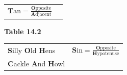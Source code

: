 {{\begin{center}
\begin{tabular}[t]{|l|l|}
                  \begin{math}\mathbf{T}\mathrm{an}=\frac{\mathbf{O}\mathrm{pposite}}{\mathbf{A}\mathrm{djacent}}\end{math}
     \tabularnewline\cline{1-1}\cline{2-2}
    \end{tabular}
      \end{center}
    \begin{center}{\small\bfseries Table 14.2}\end{center}
          }{ %
        \begin{center}
      \label{m39408*id79953}
    \noindent
      \tablelasttail{}
      \begin{xtabular}[t]{|l|l|}\hline
        \textbf{S}illy \textbf{O}ld \textbf{H}ens &
                  \begin{math}\mathbf{S}\mathrm{in}=\frac{\mathbf{O}\mathrm{pposite}}{\mathbf{H}\mathrm{ypotenuse}}\end{math}
     \tabularnewline{}
        \textbf{C}ackle \textbf{A}nd \textbf{H}owl &

\end{xtabular}
\end{center}}}

